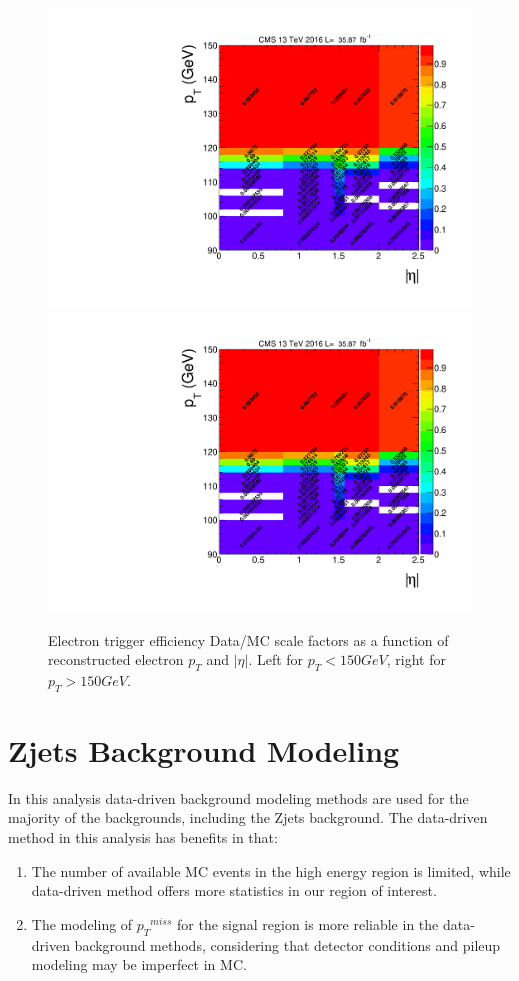 \begin{figure}[htpb]
\begin{center}
\includegraphics[width=0.49\linewidth, page=5]{figures/hlt115electron_2016fulleff_absetapt.pdf}
\includegraphics[width=0.49\linewidth, page=6]{figures/hlt115electron_2016fulleff_absetapt.pdf}
\caption{Electron trigger efficiency Data/MC scale factors as a function of reconstructed electron $p_T$ and $|\eta|$. Left for $p_T <150 GeV$, right for $p_T >150GeV$. }
\label{fig:trgeff_el_sf}
\end{center}
\end{figure}

\clearpage
\section{Zjets Background Modeling}\label{sec:dybk}
In this analysis data-driven background modeling methods are used for the majority of the backgrounds, including the Zjets background. The data-driven method in this analysis has benefits in that:
\begin{enumerate}
\item The number of available MC events in the high energy region is limited, while data-driven method offers more statistics in our region of interest.
\item The modeling of ${p_{T}}^{miss}$ for the signal region is more reliable in the data-driven background methods, considering that detector conditions and pileup modeling may be imperfect in MC.
\end{enumerate}

